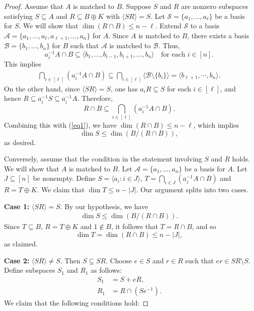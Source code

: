 \documentclass[11pt]{amsart}
\theoremstyle{definition}
\theoremstyle{remark}
\begin{document}
\begin{proof}
   Assume that $A$ is matched to $B$. Suppose $S$ and $R$ are nonzero subspaces satisfying $S \subseteq A$ and $R \subseteq B \oplus K$ with \( \langle SR \rangle = S \). Let $\mathcal{S} = \{a_1, \ldots, a_\ell\}$ be a basis for $S$. We will show that $\dim (R\cap B) \leq n - \ell$. Extend $\mathcal{S}$ to a basis $\mathcal{A} = \{a_1, \ldots, a_\ell, a_{\ell+1}, \ldots, a_n\}$ for \( A \). Since $A$ is matched to $B$, there exists a basis $\mathcal{B} = \{b_1, \ldots, b_n\}$ for $B$ such that $\mathcal{A}$ is matched to $\mathcal{B}$. Thus,
   \[
   a_i^{-1}A \cap B \subseteq \langle b_1, \ldots, b_{i-1}, b_{i+1}, \ldots, b_n \rangle  \quad \text{for each }i \in [n].
   \]
   This implies
   \begin{align}\label{eq1}
       \bigcap_{i \in [\ell]} (a_i^{-1}A \cap B) \subseteq \bigcap_{i \in [\ell]} \langle \mathcal{B} \setminus \{b_i\} \rangle = \langle b_{\ell+1}, \cdots, b_n \rangle.
   \end{align}
   On the other hand, since \( \langle SR \rangle = S \), one has \( a_i R \subseteq S \) for each $i\in[\ell]$, and hence \( R \subseteq a_i^{-1} S \subseteq a_i^{-1} A \). Therefore,
\[
R\cap B \subseteq \bigcap_{i \in [\ell]} (a_i^{-1} A \cap B).
\] 
Combining this with (\ref{eq1}), we have $\dim (R \cap B) \leq n - \ell$, which implies  
\[
\dim S\leq \dim (B / (R\cap B)),
\]
as desired.

\medskip

   Conversely, assume that the condition in the statement involving \( S \) and \( R \) holds. We will show that $A$ is matched to $B$. Let $\mathcal{A}=\{a_1,\ldots, a_n\}$ be a basis for $A$. Let $J\subseteq [n]$ be nonempty. Define $S=\langle a_i:i\in J \rangle$, $T= \bigcap_{i \in J} (a_i^{-1}A \cap B)$ and $R=T\oplus K$. We claim that $\dim T \leq n - |J|$. Our argument splits into two cases.
   
\medskip

\textbf{Case 1:} \( \langle SR \rangle = S \). By our hypothesis, we have
\begin{align*}
  \dim S\leq \dim ( B / (R \cap B)).  
\end{align*}
Since \( T \subseteq B \), \( R = T \oplus K \) and \( 1 \notin B \), it follows that \( T = R \cap B \), and so  
\[
\dim T=\dim (R \cap B)\leq n-|J|,
\]
as claimed.

\medskip

\textbf{Case 2:} \( \langle SR \rangle \neq S \).  Then \( S\subsetneq SR \). Choose \( e \in S \) and \( r \in R \) such that \( er \in SR\setminus S \). Define subspaces \( S_1 \) and \( R_1 \) as follows:
\begin{align*}
S_1 &= S + eR, \\
R_1 &= R \cap (Se^{-1}).
\end{align*}
We claim that the following conditions hold:


\end{proof}
\end{document}
